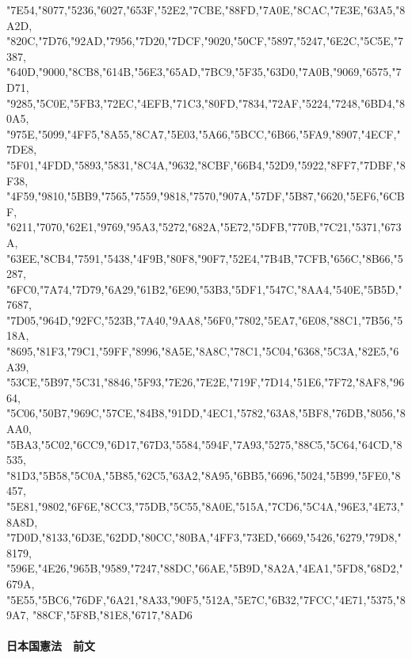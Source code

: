 \documentclass{ltjsarticle}
\begin{document}
{  "7E54,"8077,"5236,"6027,"653F,"52E2,"7CBE,"88FD,"7A0E,"8CAC,"7E3E,"63A5,"8A2D,
  "820C,"7D76,"92AD,"7956,"7D20,"7DCF,"9020,"50CF,"5897,"5247,"6E2C,"5C5E,"7387,
  "640D,"9000,"8CB8,"614B,"56E3,"65AD,"7BC9,"5F35,"63D0,"7A0B,"9069,"6575,"7D71,
  "9285,"5C0E,"5FB3,"72EC,"4EFB,"71C3,"80FD,"7834,"72AF,"5224,"7248,"6BD4,"80A5,
  "975E,"5099,"4FF5,"8A55,"8CA7,"5E03,"5A66,"5BCC,"6B66,"5FA9,"8907,"4ECF,"7DE8,
  "5F01,"4FDD,"5893,"5831,"8C4A,"9632,"8CBF,"66B4,"52D9,"5922,"8FF7,"7DBF,"8F38,
  "4F59,"9810,"5BB9,"7565,"7559,"9818,"7570,"907A,"57DF,"5B87,"6620,"5EF6,"6CBF,
  "6211,"7070,"62E1,"9769,"95A3,"5272,"682A,"5E72,"5DFB,"770B,"7C21,"5371,"673A,
  "63EE,"8CB4,"7591,"5438,"4F9B,"80F8,"90F7,"52E4,"7B4B,"7CFB,"656C,"8B66,"5287,
  "6FC0,"7A74,"7D79,"6A29,"61B2,"6E90,"53B3,"5DF1,"547C,"8AA4,"540E,"5B5D,"7687,
  "7D05,"964D,"92FC,"523B,"7A40,"9AA8,"56F0,"7802,"5EA7,"6E08,"88C1,"7B56,"518A,
  "8695,"81F3,"79C1,"59FF,"8996,"8A5E,"8A8C,"78C1,"5C04,"6368,"5C3A,"82E5,"6A39,
  "53CE,"5B97,"5C31,"8846,"5F93,"7E26,"7E2E,"719F,"7D14,"51E6,"7F72,"8AF8,"9664,
  "5C06,"50B7,"969C,"57CE,"84B8,"91DD,"4EC1,"5782,"63A8,"5BF8,"76DB,"8056,"8AA0,
  "5BA3,"5C02,"6CC9,"6D17,"67D3,"5584,"594F,"7A93,"5275,"88C5,"5C64,"64CD,"8535,
  "81D3,"5B58,"5C0A,"5B85,"62C5,"63A2,"8A95,"6BB5,"6696,"5024,"5B99,"5FE0,"8457,
  "5E81,"9802,"6F6E,"8CC3,"75DB,"5C55,"8A0E,"515A,"7CD6,"5C4A,"96E3,"4E73,"8A8D,
  "7D0D,"8133,"6D3E,"62DD,"80CC,"80BA,"4FF3,"73ED,"6669,"5426,"6279,"79D8,"8179,
  "596E,"4E26,"965B,"9589,"7247,"88DC,"66AE,"5B9D,"8A2A,"4EA1,"5FD8,"68D2,"679A,
  "5E55,"5BC6,"76DF,"6A21,"8A33,"90F5,"512A,"5E7C,"6B32,"7FCC,"4E71,"5375,"89A7,
  "88CF,"5F8B,"81E8,"6717,"8AD6}

\paragraph{日本国憲法　前文}
\end{document}
